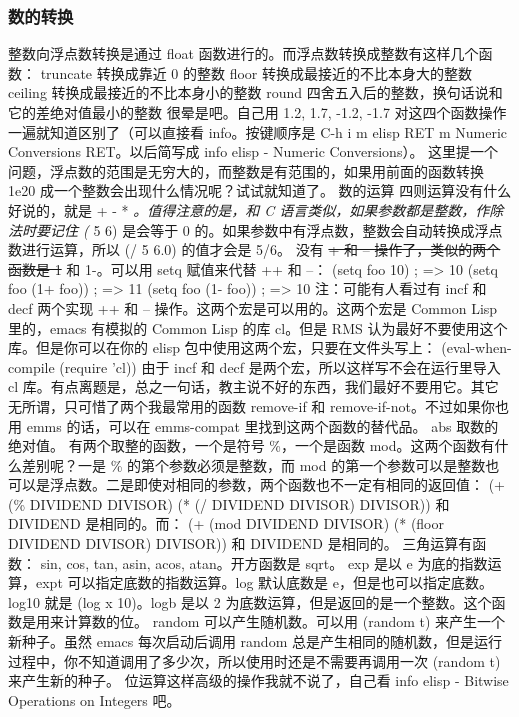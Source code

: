 \documentclass[11pt]{ctexart}
\begin{document}
\subsubsection{数的转换}
\label{sec:org5dd4f45}
整数向浮点数转换是通过 float 函数进行的。而浮点数转换成整数有这样几个函数：
truncate 转换成靠近 0 的整数
floor 转换成最接近的不比本身大的整数
ceiling 转换成最接近的不比本身小的整数
round 四舍五入后的整数，换句话说和它的差绝对值最小的整数
很晕是吧。自己用 1.2, 1.7, -1.2, -1.7 对这四个函数操作一遍就知道区别了（可以直接看 info。按键顺序是 C-h i m elisp RET m Numeric Conversions RET。以后简写成 info elisp - Numeric Conversions）。
这里提一个问题，浮点数的范围是无穷大的，而整数是有范围的，如果用前面的函数转换 1e20 成一个整数会出现什么情况呢？试试就知道了。
数的运算
四则运算没有什么好说的，就是 + - * \emph{。值得注意的是，和 C 语言类似，如果参数都是整数，作除法时要记住 (} 5 6) 是会等于 0 的。如果参数中有浮点数，整数会自动转换成浮点数进行运算，所以 (/ 5 6.0) 的值才会是 5/6。
没有 \sout{+ 和 -- 操作了，类似的两个函数是 1} 和 1-。可以用 setq 赋值来代替 ++ 和 --：
(setq foo 10)                           ; => 10
(setq foo (1+ foo))                     ; => 11
(setq foo (1- foo))                     ; => 10
注：可能有人看过有 incf 和 decf 两个实现 ++ 和 -- 操作。这两个宏是可以用的。这两个宏是 Common Lisp 里的，emacs 有模拟的 Common Lisp 的库 cl。但是 RMS 认为最好不要使用这个库。但是你可以在你的 elisp 包中使用这两个宏，只要在文件头写上：
(eval-when-compile
(require 'cl))
由于 incf 和 decf 是两个宏，所以这样写不会在运行里导入 cl 库。有点离题是，总之一句话，教主说不好的东西，我们最好不要用它。其它无所谓，只可惜了两个我最常用的函数 remove-if 和 remove-if-not。不过如果你也用 emms 的话，可以在 emms-compat 里找到这两个函数的替代品。
abs 取数的绝对值。
有两个取整的函数，一个是符号 \%，一个是函数 mod。这两个函数有什么差别呢？一是 \% 的第个参数必须是整数，而 mod 的第一个参数可以是整数也可以是浮点数。二是即使对相同的参数，两个函数也不一定有相同的返回值：
(+ (\% DIVIDEND DIVISOR)
(* (/ DIVIDEND DIVISOR) DIVISOR))
和 DIVIDEND 是相同的。而：
(+ (mod DIVIDEND DIVISOR)
(* (floor DIVIDEND DIVISOR) DIVISOR))
和 DIVIDEND 是相同的。
三角运算有函数： sin, cos, tan, asin, acos, atan。开方函数是 sqrt。
exp 是以 e 为底的指数运算，expt 可以指定底数的指数运算。log 默认底数是 e，但是也可以指定底数。log10 就是 (log x 10)。logb 是以 2 为底数运算，但是返回的是一个整数。这个函数是用来计算数的位。
random 可以产生随机数。可以用 (random t) 来产生一个新种子。虽然 emacs 每次启动后调用 random 总是产生相同的随机数，但是运行过程中，你不知道调用了多少次，所以使用时还是不需要再调用一次 (random t) 来产生新的种子。
位运算这样高级的操作我就不说了，自己看 info elisp - Bitwise Operations on Integers 吧。
\end{document}
